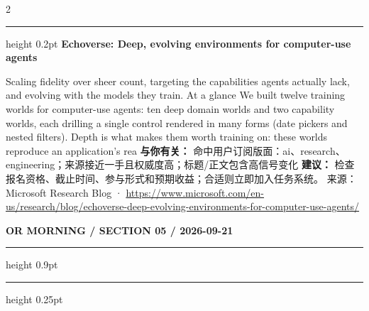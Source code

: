 \documentclass[10.5pt]{ctexart}
\begin{document}
\begin{multicols}{2}
\vspace{2mm}
\hrule height 0.2pt
\vspace{2mm}
{\large\bfseries Echoverse: Deep, evolving environments for computer-use agents}\par
Scaling fidelity over sheer count, targeting the capabilities agents actually lack, and evolving with the models they train. At a glance We built twelve training worlds for computer-use agents: ten deep domain worlds and two capability worlds, each drilling a single control rendered in many forms (date pickers and nested filters). Depth is what makes them worth training on: these worlds reproduce an application’s rea
\textbf{与你有关：} 命中用户订阅版面：ai、research、engineering；来源接近一手且权威度高；标题/正文包含高信号变化
\textbf{建议：} 检查报名资格、截止时间、参与形式和预期收益；合适则立即加入任务系统。
{\footnotesize\color{ormuted} 来源：Microsoft Research Blog · \url{https://www.microsoft.com/en-us/research/blog/echoverse-deep-evolving-environments-for-computer-use-agents/}}
\end{multicols}
\newpage
{\small\bfseries OR MORNING / SECTION 05 / 2026-09-21}
\vspace{2mm}
\hrule height 0.9pt
\vspace{1.5mm}
\hrule height 0.25pt
\vspace{4mm}
\end{document}
